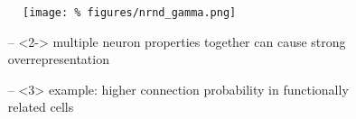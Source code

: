   








  \begin{frame}{}

    \begin{figure}
    \centering
    \texttt{[image: \%
      figures/nrnd\_gamma.png]} %
  \end{figure}

  \vspace{0.2cm}

  \begin{itemize}[leftmargin=1.3cm]
    \large
    \itemsep9pt
  \item[--]<2-> multiple neuron properties together can cause strong overrepresentation
  \item[--]<3> example: higher connection probability in functionally
\\    related cells \parencite{Lee2016a}

       
  \end{itemize}

  \vspace{0.4cm}
  
  

  
\end{frame}




